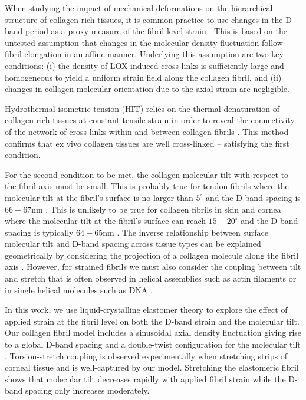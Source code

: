 \documentclass[preprint,12pt]{elsarticle}
\begin{document}
When studying the impact of mechanical deformations on the hierarchical structure of collagen-rich tissues, it is common practice to use changes in the D-band period as a proxy measure of the fibril-level strain \cite{Sasaki:1996, Misof:1997, Aziz:2018, Gautieri:2017, Gachon:2020}. This is based on the untested assumption that changes in the molecular density fluctuation follow fibril elongation in an affine manner. Underlying this assumption are two key conditions: (i) the density of LOX induced cross-links is sufficiently large  and homogeneous to yield a uniform strain field along the collagen fibril, and (ii) changes in collagen molecular orientation due to the axial strain are negligible. 

Hydrothermal isometric tension (HIT) relies on the thermal denaturation of collagen-rich tissues at constant tensile strain in order to reveal the connectivity of the network of cross-links within and between collagen fibrils \cite{Lous:1983}. This method confirms that ex vivo collagen tissues are well cross-linked \cite{Lous:1983, Allain:1980, Kampmeier:2000, Herod:2016} -- satisfying the first condition.

For the second condition to be met, the collagen molecular tilt with respect to the fibril axis must be small. This is probably true for tendon  fibrils where the molecular tilt at the fibril’s surface is no larger than $5^\circ$ and the D-band spacing is $66-67\mathrm{nm}$ \cite{Hulmes:1981, Quan:2015}. This is unlikely to be true for collagen fibrils in skin and cornea where the molecular tilt at the fibril’s surface can reach $15-20^\circ$ and the D-band spacing is typically $64-65\mathrm{nm}$ \cite{Raspanti:2018, Brodsky:1980}. The inverse relationship between surface molecular tilt and D-band spacing across tissue types can be explained geometrically by considering the projection of a collagen molecule along the fibril axis \cite{Cameron:2020, Bozec:2007}. However, for strained fibrils we must also consider the coupling between tilt and stretch that is often observed in helical assemblies such as actin filaments \cite{Tsuda:1996} or in single helical molecules such as DNA \cite{Sheinin:2009}.

In this work, we use liquid-crystalline elastomer theory to explore the effect of applied strain at the fibril level on both the D-band strain and the molecular tilt. Our collagen fibril model includes a sinusoidal axial density fluctuation giving rise to a global D-band spacing and a double-twist configuration for the molecular tilt \cite{Cameron:2020}. Torsion-stretch coupling is observed experimentally when stretching strips of corneal tissue \cite{Bell:2018} and is well-captured by our model. Stretching the elastomeric fibril shows that molecular tilt decreases rapidly with applied fibril strain while the D-band spacing only increases moderately.  
\end{document}
